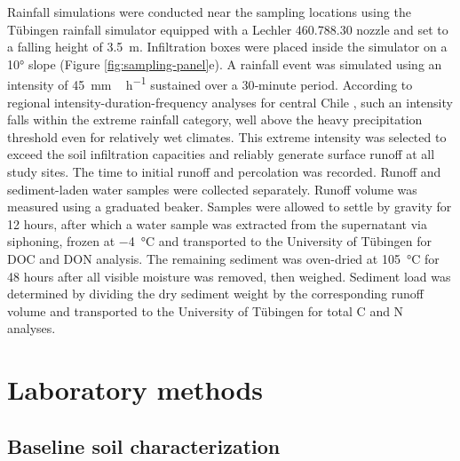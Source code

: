 \FloatBarrier

Rainfall simulations were conducted near the sampling locations using the T\"ubingen rainfall simulator \citep{Iserloh2013,Seitz2015} equipped with a Lechler 460.788.30 nozzle and set to a falling height of \SI{3.5}{\meter}. Infiltration boxes were placed inside the simulator on a \ang{10} slope (Figure \ref{fig:sampling-panel}e). A rainfall event was simulated using an intensity of \SI{45}{\milli\metre\,\hour^{-1}} sustained over a 30‐minute period. According to regional intensity-duration-frequency analyses for central Chile \citep{PizarroTapia2020}, such an intensity falls within the extreme rainfall category, well above the heavy precipitation threshold even for relatively wet climates. This extreme intensity was selected to exceed the soil infiltration capacities and reliably generate surface runoff at all study sites. The time to initial runoff and percolation was recorded. Runoff and sediment-laden water samples were collected separately. Runoff volume was measured using a graduated beaker. Samples were allowed to settle by gravity for 12 hours, after which a water sample was extracted from the supernatant via siphoning, frozen at \SI{-4}{\celsius} and transported to the University of T\"ubingen for DOC and DON analysis. The remaining sediment was oven-dried at \SI{105}{\celsius} for 48 hours after all visible moisture was removed, then weighed. Sediment load was determined by dividing the dry sediment weight by the corresponding runoff volume and transported to the University of T\"ubingen for total C and N analyses. 

\section{Laboratory methods}
\subsection{Baseline soil characterization}

